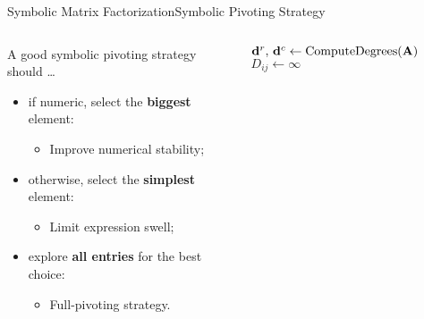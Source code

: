 \begin{frame}{Symbolic Matrix Factorization}{Symbolic Pivoting Strategy}
  \vspace{-1.75em}
  \vspace{-0.75em}
  \begin{columns}
    \begin{column}[c]{0.5\textwidth}
      A good symbolic pivoting strategy should \dots
      \begin{itemize}
        \item if numeric, select the \textbf{biggest} element:
        \begin{itemize}
          \item[] Improve numerical stability;
        \end{itemize}
        \item otherwise, select the \textbf{simplest} element:
        \begin{itemize}
          \item[] Limit expression swell;
        \end{itemize}
        \item explore \textbf{all entries} for the best choice:
        \begin{itemize}
          \item[] Full-pivoting strategy.
        \end{itemize}
      \end{itemize}
    \end{column}
    \begin{column}[c]{0.6\textwidth}
      \begin{algorithmic}\scriptsize
          \State $\mathbf{d}^r, \, \mathbf{d}^c \gets \text{ComputeDegrees}(\mathbf{A})$ %
              \State $D_{ij} \gets \infty$ %
              {} %
            \EndFor

\end{algorithmic}
\end{column}
\end{columns}
\end{frame}
